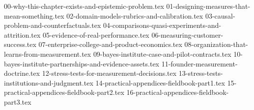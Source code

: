 
{00-why-this-chapter-exists-and-epistemic-problem.tex}
{01-designing-measures-that-mean-something.tex}
{02-domain-models-rubrics-and-calibration.tex}
{03-causal-problem-and-counterfactuals.tex}
{04-comparisons-quasi-experiments-and-attrition.tex}
{05-evidence-of-real-performance.tex}
{06-measuring-customer-success.tex}
{07-enterprise-college-and-product-economics.tex}
{08-organization-that-learns-from-measurement.tex}
{09-bayes-institute-case-and-pilot-contracts.tex}
{10-bayes-institute-partnerships-and-evidence-assets.tex}
{11-founder-measurement-doctrine.tex}
{12-stress-tests-for-measurement-decisions.tex}
{13-stress-tests-institutions-and-judgment.tex}
{14-practical-appendices-fieldbook-part1.tex}
{15-practical-appendices-fieldbook-part2.tex}
{16-practical-appendices-fieldbook-part3.tex}
